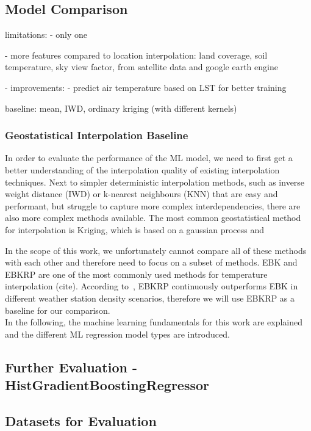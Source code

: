 \subsection{Model Comparison}



limitations:
- only one 

- more features compared to location interpolation: land coverage, soil temperature, sky view factor, from satellite data and google earth engine

- improvements:
  - predict air temperature based on LST for better training

baseline: mean, IWD, ordinary kriging (with different kernels)

\subsubsection{Geostatistical Interpolation Baseline}
In order to evaluate the performance of the ML model, we need to first get a better understanding of the interpolation quality of existing interpolation techniques. Next to simpler deterministic interpolation methods, such as inverse weight distance (IWD) or k-nearest neighbours (KNN) that are easy and performant, but struggle to capture more complex interdependencies, there are also more complex methods available. The most common geostatistical method for interpolation is Kriging, which is based on a gaussian process and 

In the scope of this work, we unfortunately cannot compare all of these methods with each other and therefore need to focus on a subset of methods. EBK and EBKRP are one of the most commonly used methods for temperature interpolation (cite). According to~\cite{njoku2023effects}, EBKRP continuously outperforms EBK in different weather station density scenarios, therefore we will use EBKRP as a baseline for our comparison.\\
In the following, the machine learning fundamentals for this work are explained and the different ML regression model types are introduced.


\subsection{Further Evaluation - HistGradientBoostingRegressor}

\subsection{Datasets for Evaluation}

